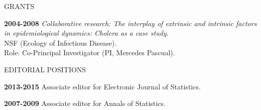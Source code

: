 \begin{mylist} {GRANTS}
\item{\bf 2004-2008 } {\em Collaborative research: The
  interplay of extrinsic and intrinsic factors in epidemiological
  dynamics: Cholera as a case study}.\\
  NSF (Ecology of Infectious Disease).
  \\
  Role: Co-Principal Investigator (PI, Mercedes Pascual).

 
\end{mylist}

\lsp
\begin{mylist}{EDITORIAL POSITIONS}
\item{\bf 2013-2015} Associate editor for Electronic Journal of Statistics.

\item{\bf 2007-2009} Associate editor for Annals of Statistics.

\end{mylist}

\lsp


